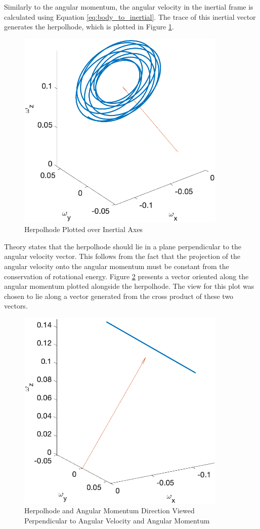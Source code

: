 Similarly to the angular momentum, the angular velocity in the inertial frame is calculated using Equation \ref{eq:body_to_inertial}. The trace of this inertial vector generates the herpolhode, which is plotted in Figure \ref{fig:herpolhode}.

\begin{figure}[H]
    \centering
    \includegraphics[width = 10cm]{Images/herpolhode_EA.png}
    \caption{Herpolhode Plotted over Inertial Axes}
    \label{fig:herpolhode}
\end{figure}

Theory states that the herpolhode should lie in a plane perpendicular to the angular velocity vector. This follows from the fact that the projection of the angular velocity onto the angular momentum must be constant from the conservation of rotational energy. Figure \ref{fig:herpolhode_perpendicular} presents a vector oriented along the angular momentum plotted alongside the herpolhode. The view for this plot was chosen to lie along a vector generated from the cross product of these two vectors. 

\begin{figure}[H]
    \centering
    \captionsetup{justification = centering}
    \includegraphics[width = 10cm]{Images/herpolhode_normal_EA.png}
    \caption{Herpolhode and Angular Momentum Direction Viewed Perpendicular to Angular Velocity and Angular Momentum}
    \label{fig:herpolhode_perpendicular}
\end{figure}

